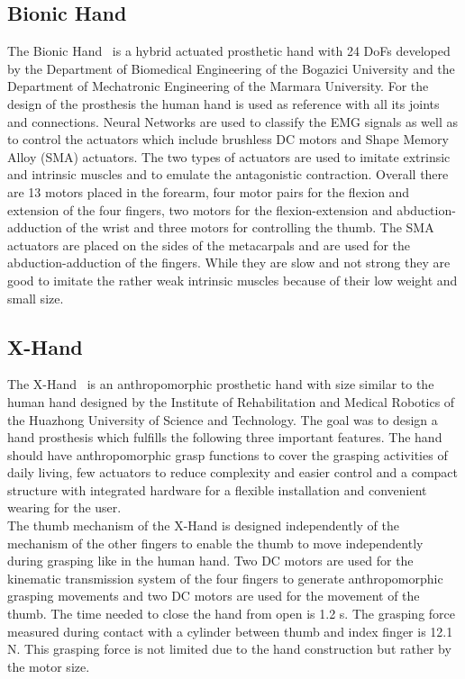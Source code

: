 \documentclass[a4paper, 10pt, conference]{ieeeconf}      %
\begin{document}
\subsection{Bionic Hand}

The Bionic Hand~\cite{bionichand} is a hybrid actuated prosthetic hand with 24 DoFs developed by the Department of Biomedical Engineering of the Bogazici University and the Department of Mechatronic Engineering of the Marmara University. For the design of the prosthesis the human hand is used as reference with all its joints and connections. Neural Networks are used to classify the EMG signals as well as to control the actuators which include brushless DC motors and Shape Memory Alloy (SMA) actuators. The two types of actuators are used to imitate extrinsic and intrinsic muscles and to emulate the antagonistic contraction. Overall there are 13 motors placed in the forearm, four motor pairs for the flexion and extension of the four fingers, two motors for the flexion-extension and abduction-adduction of the wrist and three motors for controlling the thumb. The SMA actuators are placed on the sides of the metacarpals and are used for the abduction-adduction of the fingers. While they are slow and not strong they are good to imitate the rather weak intrinsic muscles because of their low weight and small size.

\subsection{X-Hand}

The X-Hand~\cite{xhand} is an anthropomorphic prosthetic hand with size similar to the human hand designed by the Institute of Rehabilitation and Medical Robotics of the Huazhong University of Science and Technology. The goal was to design a hand prosthesis which fulfills the following three important features. The hand should have anthropomorphic grasp functions to cover the grasping activities of daily living, few actuators to reduce complexity and easier control and a compact structure with integrated hardware for a flexible installation and convenient wearing for the user.\\
The thumb mechanism of the X-Hand is designed independently of the mechanism of the other fingers to enable the thumb to move independently during grasping like in the human hand. Two DC motors are used for the kinematic transmission system of the four fingers to generate anthropomorphic grasping movements and two DC motors are used for the movement of the thumb. The time needed to close the hand from open is 1.2 s. The grasping force measured during contact with a cylinder between thumb and index finger is 12.1 N. This grasping force is not limited due to the hand construction but rather by the motor size.
\end{document}
